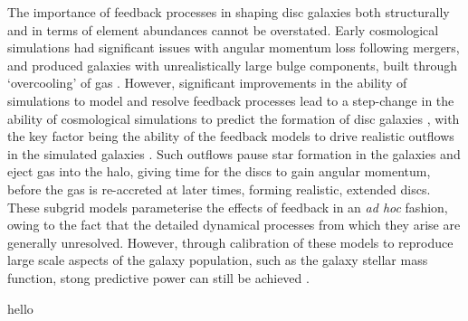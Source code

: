 The importance of feedback processes in shaping disc galaxies both structurally and in terms of element abundances cannot be overstated. Early cosmological simulations had significant issues with angular momentum loss following mergers, and produced galaxies with unrealistically large bulge components, built through `overcooling' of gas \citep[e.g.][]{1994MNRAS.267..401N}. However, significant improvements in the ability of simulations to model and resolve feedback processes lead to a step-change in the ability of cosmological simulations to predict the formation of disc galaxies \citep[e.g.][among many others]{2011ApJ...742...76G,2012MNRAS.426..690B,2012MNRAS.427..379M,2013MNRAS.436..625S,2014MNRAS.445..581H}, with the key factor being the ability of the feedback models to drive realistic outflows in the simulated galaxies \citep[e.g.][]{2008MNRAS.387.1431D,2008MNRAS.389.1137S}. Such outflows pause star formation in the galaxies and eject gas into the halo, giving time for the discs to gain angular momentum, before the gas is re-accreted at later times, forming realistic, extended discs. These subgrid models parameterise the effects of feedback in an \emph{ad hoc} fashion, owing to the fact that the detailed dynamical processes from which they arise are generally unresolved. However, through calibration of these models to reproduce large scale aspects of the galaxy population, such as the galaxy stellar mass function, stong predictive power can still be achieved \citep[good discussions of this are given in][]{2015MNRAS.446..521S,2015MNRAS.450.1937C}.

hello

